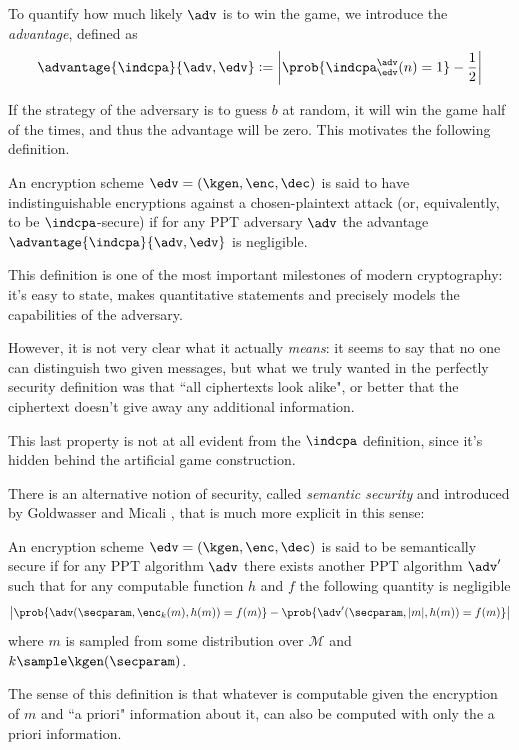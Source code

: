 To quantify how much likely $\adv$ is to win the game, we introduce the \emph{advantage}, defined as
$$\advantage{\indcpa}{\adv,\edv}:=\left| \prob{\indcpa^\adv_\edv(n)=1}-\frac12 \right|$$

If the strategy of the adversary is to guess $b$ at random, it will win the game half of the times, and thus the advantage will be zero. This motivates the following definition.

\begin{definition}
    An encryption scheme $\edv=(\kgen,\enc,\dec)$ is said to have indistinguishable encryptions against a chosen-plaintext attack (or, equivalently, to be $\indcpa$-secure) if for any PPT adversary $\adv$ the advantage $\advantage{\indcpa}{\adv,\edv}$ is negligible.
\end{definition}

This definition is one of the most important milestones of modern cryptography: it's easy to state, makes quantitative statements and precisely models the capabilities of the adversary.

However, it is not very clear what it actually \emph{means}: it seems to say that no one can distinguish two given messages, but what we truly wanted in the perfectly security definition was that ``all ciphertexts look alike", or better that the ciphertext doesn't give away any additional information.

This last property is not at all evident from the $\indcpa$ definition, since it's hidden behind the artificial game construction.

There is an alternative notion of security, called \emph{semantic security} and introduced by Goldwasser and Micali \cite{Goldwasser_ss}, that is much more explicit in this sense:
\begin{definition}
    An encryption scheme $\edv=(\kgen,\enc,\dec)$ is said to be semantically secure if for any PPT algorithm $\adv$ there exists another PPT algorithm $\adv'$ such that for any computable function $h$ and $f$ the following quantity is negligible
    $$\left| \prob{\adv(\secparam, \enc_k(m), h(m))=f(m)} - \prob{\adv'(\secparam, |m|, h(m))=f(m)}\right|$$
    where $m$ is sampled from some distribution over $\mathcal M$ and $k\sample\kgen(\secparam)$.
\end{definition}

The sense of this definition is that whatever is computable given the encryption of $m$ and ``a priori" information about it, can also be computed with only the a priori information.

